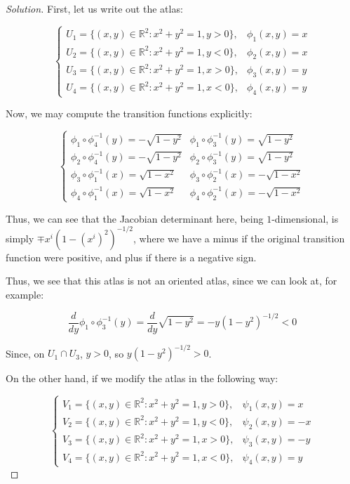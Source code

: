 \documentclass[10pt]{article}
\theoremstyle{nonumberplain}%
\begin{document}
\begin{proof}[Solution]

First, let us write out the atlas:

$$\begin{cases}  U_1 = \{ (x,y) \in \mathbb{R}^2 : x^2 + y^2 = 1, y > 0 \}, & \phi_1(x,y) = x \\ U_2 = \{ (x,y) \in \mathbb{R}^2 : x^2 + y^2 = 1, y < 0 \}, & \phi_2(x,y) = x \\  U_3 = \{ (x,y) \in \mathbb{R}^2 : x^2 + y^2 = 1, x > 0 \}, & \phi_3(x,y) = y \\ U_4 = \{ (x,y) \in \mathbb{R}^2 : x^2 + y^2 = 1, x < 0 \}, & \phi_4(x,y) = y \end{cases} $$

Now, we may compute the transition functions explicitly:

$$\begin{cases} \phi_1 \circ \phi_4^{-1}(y) = -\sqrt{1 - y^2} & \phi_1 \circ \phi_3^{-1}(y) = \sqrt{1 - y^2} \\  \phi_2 \circ \phi_4^{-1}(y) = -\sqrt{1 - y^2} & \phi_2 \circ \phi_3^{-1}(y) = \sqrt{1 - y^2}\\ \phi_3 \circ \phi_1^{-1}(x) =\sqrt{1 - x^2} & \phi_3 \circ \phi_2^{-1}(x) =- \sqrt{1 - x^2} \\ \phi_4 \circ \phi_1^{-1}(x) =\sqrt{1 - x^2} & \phi_4 \circ \phi_2^{-1}(x) =- \sqrt{1 - x^2} \end{cases} $$

Thus, we can see that the Jacobian determinant here, being $1$-dimensional, is simply $\mp x^i(1-(x^i)^2)^{-1/2}$, where we have a minus if the original transition function were positive, and plus if there is a negative sign.

Thus, we see that this atlas is not an oriented atlas, since we can look at, for example:

$$ \frac{d}{dy}  \phi_1 \circ \phi_3^{-1}(y) =  \frac{d}{dy} \sqrt{1 - y^2} = - y(1-y^2)^{-1/2} < 0$$

Since, on $U_1 \cap U_3$, $y > 0$, so $y(1-y^2)^{-1/2} > 0$.

On the other hand, if we modify the atlas in the following way:

$$\begin{cases}  V_1 = \{ (x,y) \in \mathbb{R}^2 : x^2 + y^2 = 1, y > 0 \}, & \psi_1(x,y) = x \\ V_2 = \{ (x,y) \in \mathbb{R}^2 : x^2 + y^2 = 1, y < 0 \}, & \psi_2(x,y) = -x \\  V_3 = \{ (x,y) \in \mathbb{R}^2 : x^2 + y^2 = 1, x > 0 \}, & \psi_3(x,y) = -y \\ V_4 = \{ (x,y) \in \mathbb{R}^2 : x^2 + y^2 = 1, x < 0 \}, & \psi_4(x,y) = y \end{cases} $$


\end{proof}
\end{document}

